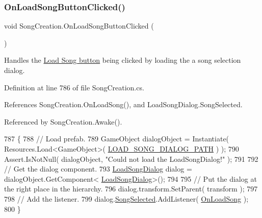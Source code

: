 \subsubsection{\texorpdfstring{On\+Load\+Song\+Button\+Clicked()}{OnLoadSongButtonClicked()}}
{\footnotesize\ttfamily void Song\+Creation.\+On\+Load\+Song\+Button\+Clicked (\begin{DoxyParamCaption}{ }\end{DoxyParamCaption})\hspace{0.3cm}{\ttfamily [private]}}



Handles the \hyperlink{group___s_c_priv_var_ga0e016451dff405f570bf530586fb36fa}{Load Song button} being clicked by loading the a song selection dialog. 



Definition at line 786 of file Song\+Creation.\+cs.



References Song\+Creation.\+On\+Load\+Song(), and Load\+Song\+Dialog.\+Song\+Selected.



Referenced by Song\+Creation.\+Awake().


\begin{DoxyCode}
787     \{
788         \textcolor{comment}{// Load prefab.}
789         GameObject dialogObject = Instantiate( Resources.Load<GameObject>( 
      \hyperlink{class_song_creation_a1e30986ba2a7d3329425b160d54b3dc7}{LOAD\_SONG\_DIALOG\_PATH} ) );
790         Assert.IsNotNull( dialogObject, \textcolor{stringliteral}{"Could not load the LoadSongDialog!"} );
791 
792         \textcolor{comment}{// Get the dialog component.}
793         \hyperlink{class_load_song_dialog}{LoadSongDialog} dialog = dialogObject.GetComponent<
      \hyperlink{class_load_song_dialog}{LoadSongDialog}>();
794 
795         \textcolor{comment}{// Put the dialog at the right place in the hierarchy.}
796         dialog.transform.SetParent( transform );
797 
798         \textcolor{comment}{// Add the listener.}
799         dialog.\hyperlink{group___s_c___l_s_d_event_ga20438ab6e4feb9616a99faee6504e86c}{SongSelected}.AddListener( \hyperlink{group___s_c_handlers_ga309a4dafb5a81353c6a83bd12ef6a249}{OnLoadSong} );
800     \}
\end{DoxyCode}
\mbox{\label{group___s_c_handlers_gadcf6d627fa8dc06d04c27512ce59dd85}} 
